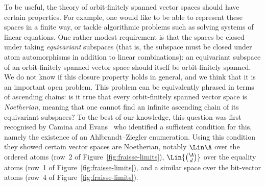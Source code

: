 To be useful, the theory of orbit-finitely spanned vector spaces should have certain properties. 
For example, one would like to be able to represent these spaces in a finite way, or tackle algorithmic problems such as solving systems of linear equations. 
One rather modest requirement is that the spaces be closed under taking \emph{equivariant} subspaces 
(that is, the subspace must be closed under atom automorphisms in addition to linear combinations): 
an equivariant subspace of an orbit-finitely spanned vector space should itself be orbit-finitely spanned. 
We do not know if this closure property holds in general, and we think that it is an important open problem. 
This problem can be equivalently phrased in terms of ascending chains: 
is it true that every orbit-finitely spanned vector space is \emph{Noetherian}, meaning that one cannot find an infinite ascending chain of its equivariant subspaces? 
To the best of our knowledge, this question was first recognised by Camina and Evans~\cite[Q.~2]{CaminaEvans_91} who identified a sufficient condition for this, namely the existence of an Ahlbrandt--Ziegler enumeration. 
Using this condition they showed certain vector spaces are Noetherian, notably $\Lin \A$ over the ordered atoms (row~2 of Figure~\ref{fig:fraisse-limits}), $\Lin {\binom \A d}$ over the equality atoms (row~1 of Figure~\ref{fig:fraisse-limits}), and a similar space over the bit-vector atoms (row~4 of Figure~\ref{fig:fraisse-limits}). 


